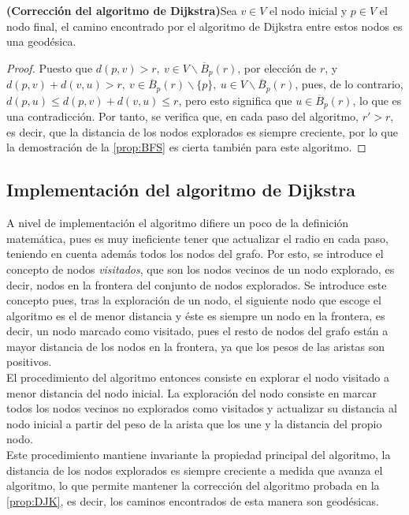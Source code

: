 \begin{proposicion}\label{prop:DJK}
	\textbf{(Corrección del algoritmo de Dijkstra)}Sea $v \in V$ el nodo inicial y $p \in V$ el nodo final, el camino encontrado por el algoritmo de Dijkstra entre estos nodos es una geodésica.
\end{proposicion}

\begin{proof}
	Puesto que $d(p,v) > r,\ v \in V\backslash\overline B_p(r)$, por elección de $r$, y $d(p,v) + d(v,u) > r,\ v \in \overline B_p(r)\backslash\{p\},\ u \in V\backslash\overline B_p(r)$, pues, de lo contrario, $d(p,u) \leq d(p,v) + d(v,u) \leq r$, pero esto significa que $u \in \overline B_p(r)$, lo que es una contradicción. Por tanto, se verifica que, en cada paso del algoritmo, $r' > r$, es decir, que la distancia de los nodos explorados es siempre creciente, por lo que la demostración de la \autoref{prop:BFS} es cierta también para este algoritmo.
\end{proof}

\subsection{Implementación del algoritmo de Dijkstra}

A nivel de implementación el algoritmo difiere un poco de la definición matemática, pues es muy ineficiente tener que actualizar el radio en cada paso, teniendo en cuenta además todos los nodos del grafo. Por esto, se introduce el concepto de nodos \textit{visitados}, que son los nodos vecinos de un nodo explorado, es decir, nodos en la frontera del conjunto de nodos explorados. Se introduce este concepto pues, tras la exploración de un nodo, el siguiente nodo que escoge el algoritmo es el de menor distancia y éste es siempre un nodo en la frontera, es decir, un nodo marcado como visitado, pues el resto de nodos del grafo están a mayor distancia de los nodos en la frontera, ya que los pesos de las aristas son positivos. \\

El procedimiento del algoritmo entonces consiste en explorar el nodo visitado a menor distancia del nodo inicial. La exploración del nodo consiste en marcar todos los nodos vecinos no explorados como visitados y actualizar su distancia al nodo inicial a partir del peso de la arista que los une y la distancia del propio nodo. \\

Este procedimiento mantiene invariante la propiedad principal del algoritmo, la distancia de los nodos explorados es siempre creciente a medida que avanza el algoritmo, lo que permite mantener la corrección del algoritmo probada en la \autoref{prop:DJK}, es decir, los caminos encontrados de esta manera son geodésicas. \\

